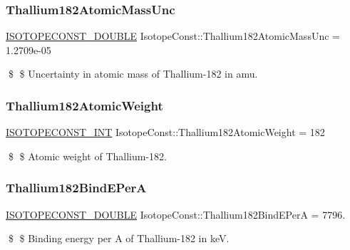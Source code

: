 \subsubsection{\texorpdfstring{Thallium182\+Atomic\+Mass\+Unc}{Thallium182AtomicMassUnc}}
{\footnotesize\ttfamily \mbox{\hyperlink{group___isotope_const-_macros_ga8f45a7272ce02c0b4c65c44636ed719a}{I\+S\+O\+T\+O\+P\+E\+C\+O\+N\+S\+T\+\_\+\+D\+O\+U\+B\+LE}} Isotope\+Const\+::\+Thallium182\+Atomic\+Mass\+Unc = 1.\+2709e-\/05}

\$ \$ Uncertainty in atomic mass of Thallium-\/182 in amu. \mbox{\label{group___isotope_const-_thallium-_tl182_gab47dae5c78201e47c6fab453265c0fd1}} 
\subsubsection{\texorpdfstring{Thallium182\+Atomic\+Weight}{Thallium182AtomicWeight}}
{\footnotesize\ttfamily \mbox{\hyperlink{group___isotope_const-_macros_ga5f18360b3e99483a35c32d789e62621c}{I\+S\+O\+T\+O\+P\+E\+C\+O\+N\+S\+T\+\_\+\+I\+NT}} Isotope\+Const\+::\+Thallium182\+Atomic\+Weight = 182}

\$ \$ Atomic weight of Thallium-\/182. \mbox{\label{group___isotope_const-_thallium-_tl182_ga05208c78ebbfaf04193cdc4ff77c170d}} 
\subsubsection{\texorpdfstring{Thallium182\+Bind\+E\+PerA}{Thallium182BindEPerA}}
{\footnotesize\ttfamily \mbox{\hyperlink{group___isotope_const-_macros_ga8f45a7272ce02c0b4c65c44636ed719a}{I\+S\+O\+T\+O\+P\+E\+C\+O\+N\+S\+T\+\_\+\+D\+O\+U\+B\+LE}} Isotope\+Const\+::\+Thallium182\+Bind\+E\+PerA = 7796.}

\$ \$ Binding energy per A of Thallium-\/182 in keV. \mbox{\label{group___isotope_const-_thallium-_tl182_gafdf8adea8fd8bbfc779bf981b6918a4e}} 
